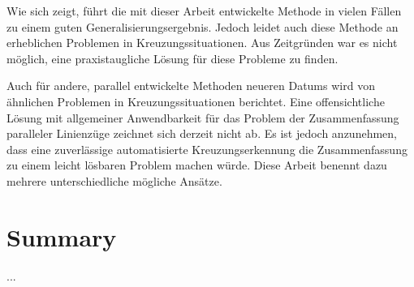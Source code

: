 \documentclass[../main/thesis.tex]{subfiles}
\begin{document}
Wie sich zeigt, führt die mit dieser Arbeit entwickelte Methode in vielen Fällen zu einem guten Generalisierungsergebnis.
Jedoch leidet auch diese Methode an erheblichen Problemen in Kreuzungssituationen.
Aus Zeitgründen war es nicht möglich, eine praxistaugliche Lösung für diese Probleme zu finden.


Auch für andere, parallel entwickelte Methoden neueren Datums wird von ähnlichen Problemen in Kreuzungssituationen berichtet.
Eine offensichtliche Lösung mit allgemeiner Anwendbarkeit für das Problem der Zusammenfassung paralleler Linienzüge zeichnet sich derzeit nicht ab.
Es ist jedoch anzunehmen, dass eine zuverlässige automatisierte Kreuzungserkennung die Zusammenfassung zu einem leicht lösbaren Problem machen würde.
Diese Arbeit benennt dazu mehrere unterschiedliche mögliche Ansätze.






\chapter*{Summary}

...



\end{document}
